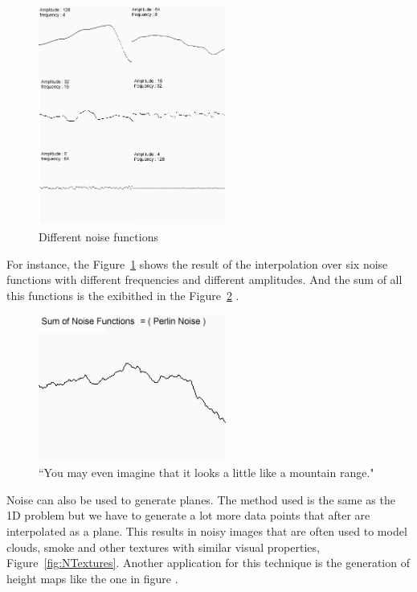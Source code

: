 \begin{figure}[htbp]
	\centering
	\includegraphics[width=0.55\textwidth]{img/Theory/Perlin_Noise/Merge.png}
	\caption{Different noise functions}
	\label{fig:merge}
\end{figure}

For instance, the Figure~\ref{fig:merge} shows the result of the interpolation over six noise functions with different frequencies and different amplitudes. And the sum of all this functions is the exibithed in the Figure~\ref{fig:noise} \cite{NoisesELIAS}.

\begin{figure}[htbp]
	\centering
	\includegraphics[width=0.55\textwidth]{img/Theory/Perlin_Noise/perlin1.png}
	\caption{``You may even imagine that it looks a little like a mountain range."}
	\label{fig:noise}
\end{figure}

Noise can also be used to generate planes. The method used is the same as the 1D problem but we have to generate a lot more data points that after are interpolated as a plane. This results in noisy images that are often used to model clouds, smoke and other textures with similar visual properties, Figure~\ref{fig:NTextures}. Another application for this technique is the generation of height maps like the one in figure .

